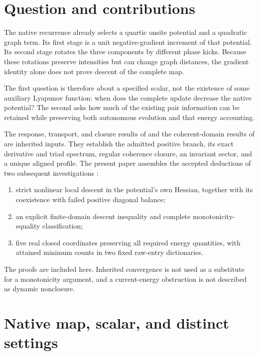 \section{Question and contributions}\label{sec:intro}

The native recurrence already selects a quartic onsite potential and a quadratic graph term. Its first stage is a unit negative-gradient increment of that potential. Its second stage rotates the three components by different phase kicks. Because these rotations preserve intensities but can change graph distances, the gradient identity alone does not prove descent of the complete map.

The first question is therefore about a specified scalar, not the existence of some auxiliary Lyapunov function: when does the complete update decrease the native potential? The second asks how much of the existing pair information can be retained while preserving both autonomous evolution and that energy accounting.

The response, transport, and closure results of \cite{nrg} and the coherent-domain results of \cite{relaxation} are inherited inputs. They establish the admitted positive branch, its exact derivative and triad spectrum, regular coherence closure, an invariant sector, and a unique aligned profile. The present paper assembles the accepted deductions of two subsequent investigations \cite{energy,information}:
\begin{enumerate}
\item strict nonlinear local descent in the potential's own Hessian, together with its coexistence with failed positive diagonal balance;
\item an explicit finite-domain descent inequality and complete monotonicity-equality classification;
\item five real closed coordinates preserving all required energy quantities, with attained minimum counts in two fixed raw-entry dictionaries.
\end{enumerate}
The proofs are included here. Inherited convergence is not used as a substitute for a monotonicity argument, and a current-energy obstruction is not described as dynamic nonclosure.

\section{Native map, scalar, and distinct settings}\label{sec:setting}

